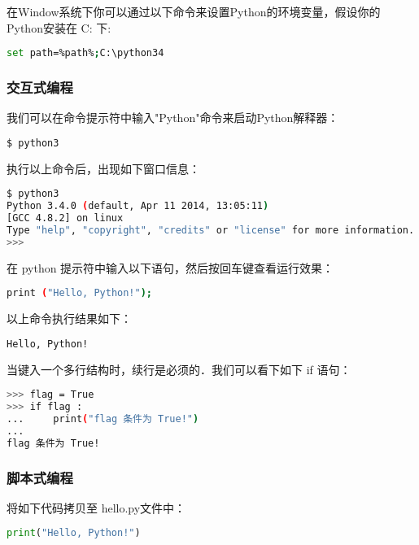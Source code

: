 在Window系统下你可以通过以下命令来设置Python的环境变量，假设你的Python安装在 C: 下:

\begin{lstlisting}[language=bash]
set path=%path%;C:\python34
\end{lstlisting}

\subsubsection{交互式编程}

我们可以在命令提示符中输入"Python"命令来启动Python解释器：

\begin{lstlisting}[language=bash]
$ python3
\end{lstlisting}

执行以上命令后，出现如下窗口信息：

\begin{lstlisting}[language=bash]
$ python3
Python 3.4.0 (default, Apr 11 2014, 13:05:11) 
[GCC 4.8.2] on linux
Type "help", "copyright", "credits" or "license" for more information.
>>> 
\end{lstlisting}

在 python 提示符中输入以下语句，然后按回车键查看运行效果：

\begin{lstlisting}[language=bash]
print ("Hello, Python!");
\end{lstlisting}

以上命令执行结果如下：

\begin{lstlisting}[language=bash]
Hello, Python!
\end{lstlisting}

当键入一个多行结构时，续行是必须的．我们可以看下如下 if 语句：

\begin{lstlisting}[language=bash]
>>> flag = True
>>> if flag :
...     print("flag 条件为 True!")
... 
flag 条件为 True!
\end{lstlisting}

\subsubsection{脚本式编程}

将如下代码拷贝至 hello.py文件中：

\begin{lstlisting}[language=python]
print("Hello, Python!")
\end{lstlisting}

